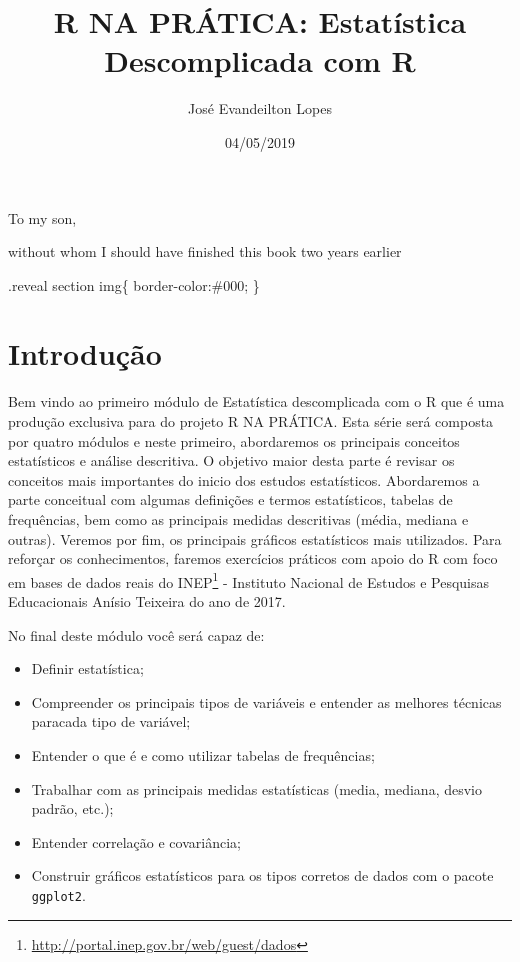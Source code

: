 \documentclass[11pt,]{style/krantz}
\title{R NA PRÁTICA: Estatística Descomplicada com R}
\author{José Evandeilton Lopes}
\date{04/05/2019}
\providecommand{\tightlist}{%
  \setlength{\itemsep}{0pt}\setlength{\parskip}{0pt}}
\renewcommand{\href}[2]{#2\footnote{\url{#1}}}
\theoremstyle{definition}
\theoremstyle{definition}
\theoremstyle{definition}
\theoremstyle{remark}
\begin{document}
\maketitle


\thispagestyle{empty}

\begin{center}
To my son,

without whom I should have finished this book two years earlier
\end{center}

\setlength{\abovedisplayskip}{-5pt}
\setlength{\abovedisplayshortskip}{-5pt}

{
\hypersetup{linkcolor=}
\setcounter{tocdepth}{2}
\tableofcontents
}
\listoftables
\listoffigures
.reveal section img\{
border-color:\#000;
\}

\hypertarget{introducao}{%
\chapter*{Introdução}\label{introducao}}


Bem vindo ao primeiro módulo de Estatística descomplicada com o R que é uma produção exclusiva para do projeto R NA PRÁTICA. Esta série será composta por quatro módulos e neste primeiro, abordaremos os principais conceitos estatísticos e análise descritiva. O objetivo maior desta parte é revisar os conceitos mais importantes do inicio dos estudos estatísticos. Abordaremos a parte conceitual com algumas definições e termos estatísticos, tabelas de frequências, bem como as principais medidas descritivas (média, mediana e outras). Veremos por fim, os principais gráficos estatísticos mais utilizados. Para reforçar os conhecimentos, faremos exercícios práticos com apoio do R com foco em bases de dados reais do \href{http://portal.inep.gov.br/web/guest/dados}{INEP} - Instituto Nacional de Estudos e Pesquisas Educacionais Anísio Teixeira do ano de 2017.

No final deste módulo você será capaz de:

\begin{itemize}
\tightlist
\item
  Definir estatística;
\item
  Compreender os principais tipos de variáveis e entender as melhores técnicas paracada tipo de variável;
\item
  Entender o que é e como utilizar tabelas de frequências;
\item
  Trabalhar com as principais medidas estatísticas (media, mediana, desvio padrão, etc.);
\item
  Entender correlação e covariância;
\item
  Construir gráficos estatísticos para os tipos corretos de dados com o pacote \texttt{ggplot2}.
\end{itemize}
\end{document}
